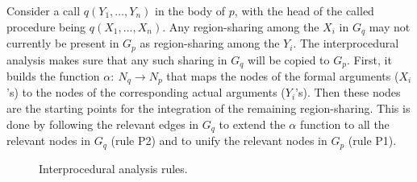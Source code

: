\documentclass{tlp}
\newcommand{\args}[2][X]{\ensuremath{#1_1, \ldots, #1_#2}}
\begin{document}
\sloppy
Consider a call $q(\args[Y]{n})$ in the body of $p$,
with the head of the called procedure being $q(\args[X]{n})$.
Any region-sharing among the $X_i$ in $G_q$
may not currently be present in $G_p$ as region-sharing among the $Y_i$.
The interprocedural analysis makes sure that
any such sharing in $G_q$ will be copied to $G_p$.
First, it builds the function $\alpha:~N_q \rightarrow N_p$ that
maps the nodes of the formal arguments ($X_i$'s)
to the nodes of the corresponding actual arguments ($Y_i$'s).
Then these nodes are the starting points for the
integration of the remaining region-sharing.
This is done by following the relevant edges in $G_q$
to extend the $\alpha$ function to all the relevant nodes in $G_q$ (rule P2)
and to unify the relevant nodes in $G_p$ (rule P1).

\begin{figure}
\centering
{}
\small
\caption{Interprocedural analysis rules.}
\normalsize
\label{fig:inter:rules}
\end{figure}
\end{document}
